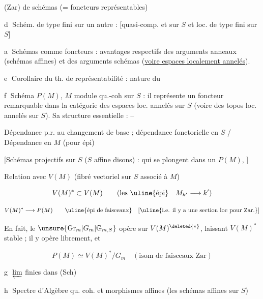 
 (Zar) de schémas (= foncteurs représentables)


\textcircled{d} Schém. de type fini sur un autre  : [quasi-comp. et sur $S$ et loc. de type fini sur $S$]

\textcircled{a} Schémas comme foncteurs : avantages respectifs des arguments anneaux (schémas affines) et des arguments schémas (\uline{voire espaces localement annelés}).

\textcircled{e} Corollaire du th. de représentabilité : nature  du 

\textcircled{f} Schéma $P(M)$, $M$ module qu.-coh sur $S$  : il représente un foncteur remarquable  dans la catégorie des espaces loc. annelés sur $S$ (voire des topos loc. annelés sur $S$). Sa structure essentielle : --


Dépendance p.r. au changement de base ; dépendance fonctorielle en $S$ / Dépendance en $M$ (pour épi)

[Schémas projectifs sur $S$ ($S$ affine disons) : qui se plongent  dans un $P(M)$,  ]


Relation avec $V(M)$ (fibré vectoriel sur $S$ associé à $M$)

\[ V(M)^*\subset V(M)\qquad(\text{les \uline{épi}}\quad M_{k'}\longrightarrow k') \]

\[ V(M)^*\longrightarrow P(M)\qquad\text{\uline{épi de faisceaux}}\quad[\text{\uline{i.e. il y a une section loc pour Zar.}}] \]

En fait, le $\unsure{\mathrm{Gr}_m|G_m|\mathbb{G}_{m,S}}$ opère sur $V(M)^{\deleted{*}}$, laissant $V(M)^*$ stable ; il y opère librement, et

\[ P(M)\simeq V(M)^*/G_m\quad(\text{isom de faisceaux Zar}) \]

\textcircled{g} $\varprojlim$ finies dans (Sch)

\textcircled{h} Spectre d'Algèbre qu. coh. et  morphismes affines (les schémas affines sur $S$)

